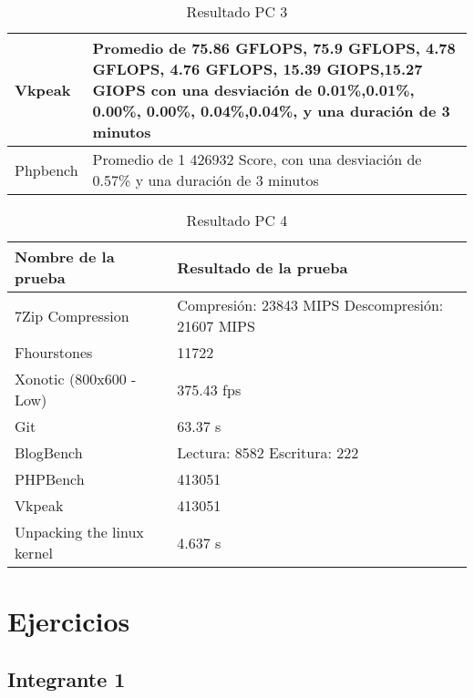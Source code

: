 \documentclass[12pt]{article}
\begin{document}
\begin{table}[!htb]
\begin{tabular}{|p{5cm}|p{9cm}|}
        \hline
        Vkpeak & Promedio de 75.86 GFLOPS, 75.9 GFLOPS, 4.78 GFLOPS, 4.76 GFLOPS, 15.39 GIOPS,15.27 GIOPS\newline
        con una desviación de 0.01\%,0.01\%, 0.00\%, 0.00\%, 0.04\%,0.04\%, \newline
        y una duración de 3 minutos \\
        \hline
        Phpbench & Promedio de 1 426932 Score, \newline
        con una desviación de 0.57\% \newline
        y una duración de 3 minutos \\
        \hline
    \end{tabular}
    \caption{Resultado PC 3}
\end{table}

\begin{table}[!htb]
    \centering
    \begin{tabular}{|p{5cm}|p{9cm}|}
        \hline
        \textbf{Nombre de la prueba} & \textbf{Resultado de la prueba}\\
        \hline
        7Zip Compression & Compresión: 23843 MIPS \newline 
        Descompresión: 21607 MIPS \\
        \hline
        Fhourstones & 11722 \\
        \hline
        Xonotic (800x600 - Low) &  375.43 fps\\
        \hline
        Git & 63.37 s\\
        \hline
        BlogBench & Lectura: 8582 \newline
        Escritura: 222 \\
        \hline
        PHPBench &  413051\\
        \hline
        Vkpeak &  413051\\
        \hline
        Unpacking the linux kernel & 4.637 s\\
        \hline
    \end{tabular}
    \caption{Resultado PC 4}
\end{table}

\newpage
\section{Ejercicios}
\subsection{Integrante 1}
\end{document}
